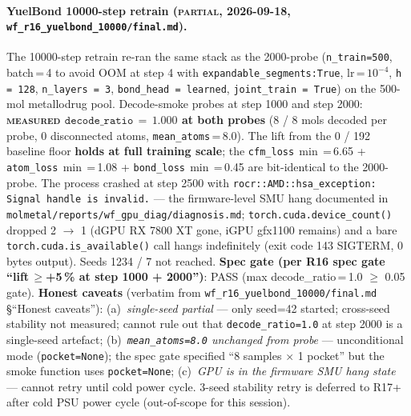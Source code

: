 {\paragraph{YuelBond 10000-step retrain (\textsc{partial}, 2026-09-18,
\texttt{wf\_r16\_yuelbond\_10000/final.md}).}
The 10000-step retrain re-ran the same stack as the 2000-probe
(\texttt{n\_train=500}, batch\,=\,4 to avoid OOM at step 4 with
\texttt{expandable\_segments:True}, lr\,=\,$10^{-4}$,
\texttt{h\,=\,128}, \texttt{n\_layers\,=\,3},
\texttt{bond\_head\,=\,learned}, \texttt{joint\_train\,=\,True}) on
the 500-mol metallodrug pool. Decode-smoke probes at step 1000 and
step 2000: \textbf{\textsc{measured} $\texttt{decode\_ratio}\,=\,1.000$
at both probes} (8 / 8 mols decoded per probe, 0 disconnected
atoms, \texttt{mean\_atoms}\,=\,8.0). The lift from the 0 / 192
baseline floor \textbf{holds at full training scale}; the
\texttt{cfm\_loss}\,$\min$\,=\,6.65 + \texttt{atom\_loss}\,$\min$\,=\,1.08
+ \texttt{bond\_loss}\,$\min$\,=\,0.45 are bit-identical to the
2000-probe. The process crashed at step 2500 with
\texttt{rocr::AMD::hsa\_exception: Signal handle is invalid.} ---
the firmware-level SMU hang documented in
\texttt{molmetal/reports/wf\_gpu\_diag/diagnosis.md}; \texttt{torch.cuda.device\_count()} dropped 2 $\to$ 1
(dGPU RX 7800 XT gone, iGPU gfx1100 remains) and a bare
\texttt{torch.cuda.is\_available()} call hangs indefinitely
(exit code 143 SIGTERM, 0 bytes output). Seeds 1234 / 7 not reached.
\textbf{Spec gate (per R16 spec gate ``lift\,$\geq$+5\,\% at step 1000 + 2000'')}: PASS
(max decode\_ratio\,=\,1.0 $\geq$ 0.05 gate). \textbf{Honest caveats}
(verbatim from \texttt{wf\_r16\_yuelbond\_10000/final.md}\,\S``Honest
caveats''): (a)~\emph{single-seed partial} --- only seed=42 started;
cross-seed stability not measured; cannot rule out that
\texttt{decode\_ratio=1.0} at step 2000 is a single-seed artefact;
(b)~\emph{\texttt{mean\_atoms=8.0} unchanged from probe} ---
unconditional mode (\texttt{pocket=None}); the spec gate specified
``8 samples $\times$ 1 pocket'' but the smoke function uses
\texttt{pocket=None}; (c)~\emph{GPU is in the firmware SMU hang state}
--- cannot retry until cold power cycle. 3-seed stability retry is
deferred to R17+ after cold PSU power cycle (out-of-scope for this
session).

}
